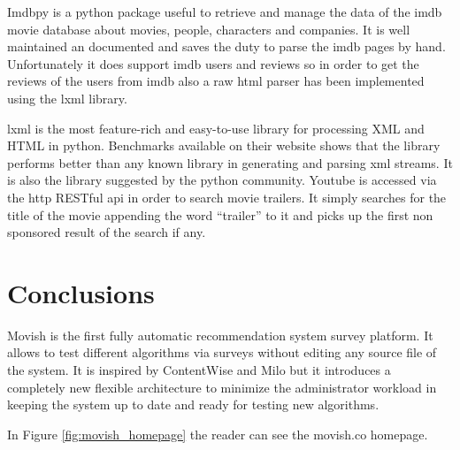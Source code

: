 Imdbpy is a python package useful to retrieve and manage the data of the imdb movie database about movies, people, characters and companies. It is well maintained an documented and saves the duty to parse the imdb pages by hand. Unfortunately it does support imdb users and reviews so in order to get the reviews of the users from imdb also a raw html parser has been implemented using the lxml library.

lxml is the most feature-rich and easy-to-use library for processing XML and HTML in python. Benchmarks available on their website shows that the library performs better than any known library in generating and parsing xml streams. It is also the library suggested by the python community.
Youtube is accessed via the http RESTful api in order to search movie trailers. It simply searches for the title of the movie appending the word ``trailer'' to it and picks up the first non sponsored result of the search if any.

\section{Conclusions}
\label{sec:movish_conclusions}

Movish is the first fully automatic recommendation system survey platform. It allows to test different algorithms via surveys without editing any source file of the system. It is inspired by ContentWise and Milo but it introduces a completely new flexible architecture to minimize the administrator workload in keeping the system up to date and ready for testing new algorithms.  

In Figure \ref{fig:movish_homepage} the reader can see the movish.co homepage. 

